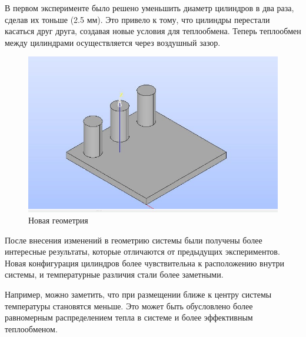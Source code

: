 \documentclass[a4paper,12pt]{article}
\theoremstyle{plain} %
\theoremstyle{definition} %
\theoremstyle{remark} %
\begin{document}
В первом эксперименте было решено уменьшить диаметр цилиндров в два раза, сделав их тоньше (2.5 мм). Это привело к тому, что цилиндры перестали касаться друг друга, создавая новые условия для теплообмена. Теперь теплообмен между цилиндрами осуществляется через воздушный зазор.

\begin{figure}[h]
	\begin{center}
		\includegraphics[width=0.4\linewidth]{20.jpg}
		\caption{Новая геометрия} %
	\end{center}
\end{figure}

После внесения изменений в геометрию системы были получены более интересные результаты, которые отличаются от предыдущих экспериментов. Новая конфигурация цилиндров более чувствительна к расположению внутри системы, и температурные различия стали более заметными.

Например, можно заметить, что при размещении ближе к центру системы температуры становятся меньше. Это может быть обусловлено более равномерным распределением тепла в системе и более эффективным теплообменом.
\end{document}
